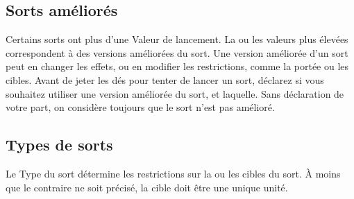 \subsection{Sorts améliorés}
\label{boosted_spells}

Certains sorts ont plus d'une Valeur de lancement. La ou les valeurs plus élevées correspondent à des versions améliorées du sort. Une version améliorée d'un sort peut en changer les effets, ou en modifier les restrictions, comme la portée ou les cibles. Avant de jeter les dés pour tenter de lancer un sort, déclarez si vous souhaitez utiliser une version améliorée du sort, et laquelle. Sans déclaration de votre part, on considère toujours que le sort n'est pas amélioré.

\subsection{Types de sorts}

Le Type du sort détermine les restrictions sur la ou les cibles du sort. À moins que le contraire ne soit précisé, la cible doit être une unique unité.

\paragraph{\augment}


\paragraph{\aura}


\paragraph{\damage}


\paragraph{\direct}


